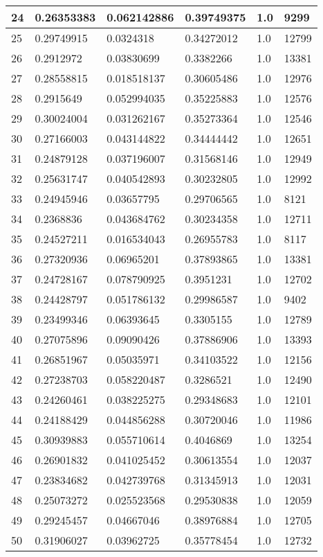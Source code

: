 \begin{longtable}{|l|l|l|l|l|l|}
24 & 0.26353383 & 0.062142886 & 0.39749375 & 1.0 & 9299 \\ \hline 
25 & 0.29749915 & 0.0324318 & 0.34272012 & 1.0 & 12799 \\ \hline 
26 & 0.2912972 & 0.03830699 & 0.3382266 & 1.0 & 13381 \\ \hline 
27 & 0.28558815 & 0.018518137 & 0.30605486 & 1.0 & 12976 \\ \hline 
28 & 0.2915649 & 0.052994035 & 0.35225883 & 1.0 & 12576 \\ \hline 
29 & 0.30024004 & 0.031262167 & 0.35273364 & 1.0 & 12546 \\ \hline 
30 & 0.27166003 & 0.043144822 & 0.34444442 & 1.0 & 12651 \\ \hline 
31 & 0.24879128 & 0.037196007 & 0.31568146 & 1.0 & 12949 \\ \hline 
32 & 0.25631747 & 0.040542893 & 0.30232805 & 1.0 & 12992 \\ \hline 
33 & 0.24945946 & 0.03657795 & 0.29706565 & 1.0 & 8121 \\ \hline 
34 & 0.2368836 & 0.043684762 & 0.30234358 & 1.0 & 12711 \\ \hline 
35 & 0.24527211 & 0.016534043 & 0.26955783 & 1.0 & 8117 \\ \hline 
36 & 0.27320936 & 0.06965201 & 0.37893865 & 1.0 & 13381 \\ \hline 
37 & 0.24728167 & 0.078790925 & 0.3951231 & 1.0 & 12702 \\ \hline 
38 & 0.24428797 & 0.051786132 & 0.29986587 & 1.0 & 9402 \\ \hline 
39 & 0.23499346 & 0.06393645 & 0.3305155 & 1.0 & 12789 \\ \hline 
40 & 0.27075896 & 0.09090426 & 0.37886906 & 1.0 & 13393 \\ \hline 
41 & 0.26851967 & 0.05035971 & 0.34103522 & 1.0 & 12156 \\ \hline 
42 & 0.27238703 & 0.058220487 & 0.3286521 & 1.0 & 12490 \\ \hline 
43 & 0.24260461 & 0.038225275 & 0.29348683 & 1.0 & 12101 \\ \hline 
44 & 0.24188429 & 0.044856288 & 0.30720046 & 1.0 & 11986 \\ \hline 
45 & 0.30939883 & 0.055710614 & 0.4046869 & 1.0 & 13254 \\ \hline 
46 & 0.26901832 & 0.041025452 & 0.30613554 & 1.0 & 12037 \\ \hline 
47 & 0.23834682 & 0.042739768 & 0.31345913 & 1.0 & 12031 \\ \hline 
48 & 0.25073272 & 0.025523568 & 0.29530838 & 1.0 & 12059 \\ \hline 
49 & 0.29245457 & 0.04667046 & 0.38976884 & 1.0 & 12705 \\ \hline 
50 & 0.31906027 & 0.03962725 & 0.35778454 & 1.0 & 12732 \\ \hline 
\end{longtable}